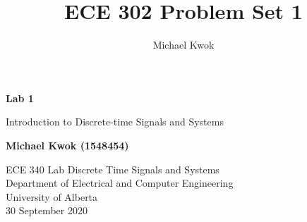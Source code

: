 \documentclass{article}
\title{ECE 302 Problem Set 1}
\author{Michael Kwok}
\begin{document}
\begin{titlepage}
     \begin{center}
          \vspace*{1cm}

          \textbf{Lab 1}

          \vspace{0.5cm}

          \Large{Introduction to Discrete-time Signals and Systems}
          \vspace{1.5cm}

          \textbf{Michael Kwok (1548454)}

          \vfill
          ECE 340 Lab Discrete Time Signals and Systems\\
          Department of Electrical and Computer Engineering\\
          University of Alberta\\
          30 September 2020
     \end{center}
\end{titlepage}
\end{document}
